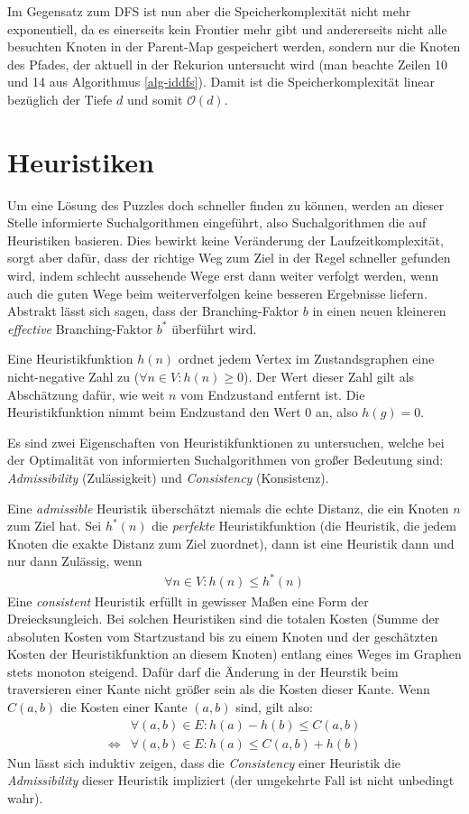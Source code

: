 \documentclass{whswinvcbook}
\begin{document}
Im Gegensatz zum DFS ist nun aber die Speicherkomplexität nicht mehr exponentiell, da es einerseits kein Frontier mehr gibt und andererseits nicht alle besuchten Knoten in der Parent-Map gespeichert werden, sondern nur die Knoten des Pfades, der aktuell in der Rekurion untersucht wird (man beachte Zeilen 10 und 14 aus Algorithmus \ref{alg-iddfs}). Damit ist die Speicherkomplexität linear bezüglich der Tiefe $d$ und somit $\mathcal{O}(d)$.
\section{Heuristiken}
Um eine Lösung des Puzzles doch schneller finden zu können, werden an dieser Stelle informierte Suchalgorithmen eingeführt, also Suchalgorithmen die auf Heuristiken basieren. Dies bewirkt keine Veränderung der Laufzeitkomplexität, sorgt aber dafür, dass der richtige Weg zum Ziel in der Regel schneller gefunden wird, indem schlecht aussehende Wege erst dann weiter verfolgt werden, wenn auch die guten Wege beim weiterverfolgen keine besseren Ergebnisse liefern. Abstrakt lässt sich sagen, dass der Branching-Faktor $b$ in einen neuen kleineren \textit{effective} Branching-Faktor $b^*$ überführt wird.

Eine Heuristikfunktion $h(n)$ ordnet jedem Vertex im Zustandsgraphen eine nicht-negative Zahl zu ($\forall n\in V:h(n)\geq0$). Der Wert dieser Zahl gilt als Abschätzung dafür, wie weit $n$ vom Endzustand entfernt ist. Die Heuristikfunktion nimmt beim Endzustand den Wert $0$ an, also $h(g)=0$.

Es sind zwei Eigenschaften von Heuristikfunktionen zu untersuchen, welche bei der Optimalität von informierten Suchalgorithmen von großer Bedeutung sind: \textit{Admissibility} (Zulässigkeit) und \textit{Consistency} (Konsistenz).

Eine \textit{admissible} Heuristik überschätzt niemals die echte Distanz, die ein Knoten $n$ zum Ziel hat. Sei $h^*(n)$ die \textit{perfekte} Heuristikfunktion (die Heuristik, die jedem Knoten die exakte Distanz zum Ziel zuordnet), dann ist eine Heuristik dann und nur dann Zulässig, wenn
\begin{align}\label{eq-ad}
    \forall n\in V:h(n)\leq h^*(n)
\end{align}
Eine \textit{consistent} Heuristik erfüllt in gewisser Maßen eine Form der Dreiecksungleich. Bei solchen Heuristiken sind die totalen Kosten (Summe der absoluten Kosten vom Startzustand bis zu einem Knoten und der geschätzten Kosten der Heuristikfunktion an diesem Knoten) entlang eines Weges im Graphen stets monoton steigend. Dafür darf die Änderung in der Heurstik beim traversieren einer Kante nicht größer sein als die Kosten dieser Kante. Wenn $C(a,b)$ die Kosten einer Kante $(a,b)$ sind, gilt also:
\begin{align}
    &\forall(a,b)\in E:h(a)-h(b)\leq C(a,b)\label{eq-con1}\\
    \Longleftrightarrow&\forall(a,b)\in E:h(a)\leq C(a,b)+h(b)\label{eq-con2}
\end{align}
Nun lässt sich induktiv zeigen, dass die \textit{Consistency} einer Heuristik die \textit{Admissibility} dieser Heuristik impliziert (der umgekehrte Fall ist nicht unbedingt wahr).
\end{document}
